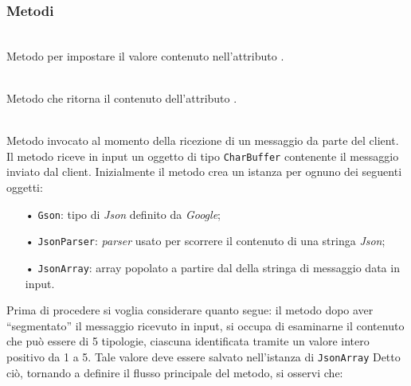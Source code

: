 
\subsubsection*{Metodi}
\begin{description}

	\item{}\\
	Metodo per impostare il valore contenuto nell'attributo .
	
	\item{}\\
	Metodo che ritorna il contenuto dell'attributo .
	
	\item{}\\
	Metodo invocato al momento della ricezione di un messaggio da parte del client. Il metodo riceve in input un oggetto di tipo \texttt{CharBuffer} contenente il messaggio inviato dal client.
Inizialmente il metodo crea un istanza per ognuno dei seguenti oggetti:
	\begin{itemize}
		\item[•]\texttt{Gson}: tipo di \textit{Json} definito da \textit{Google};
		\item[•]\texttt{JsonParser}: \textit{parser} usato per scorrere il contenuto di una stringa \textit{Json};
		\item[•]\texttt{JsonArray}: array popolato a partire dal  della stringa di messaggio data in input.
	\end{itemize}
	
	Prima di procedere si voglia considerare quanto segue: il metodo dopo aver ``segmentato'' il messaggio ricevuto in input, si occupa di esaminarne il contenuto che può essere di 5 tipologie, ciascuna identificata tramite un valore intero positivo da 1 a 5. Tale valore deve essere salvato nell'istanza di \texttt{JsonArray}
	Detto ciò, tornando a definire il flusso principale del metodo, si osservi che:


\end{description}
